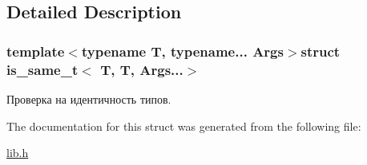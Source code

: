 \subsection{Detailed Description}
\subsubsection*{template$<$typename T, typename... Args$>$struct is\-\_\-same\-\_\-t$<$ T, T, Args...$>$}

Проверка на идентичность типов. 

The documentation for this struct was generated from the following file\-:\begin{DoxyCompactItemize}
\item 
\hyperlink{lib_8h}{lib.\-h}\end{DoxyCompactItemize}
